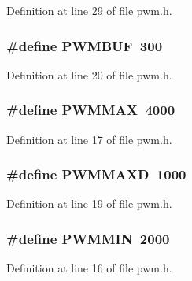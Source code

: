 Definition at line 29 of file pwm.\+h.

\subsubsection[{\texorpdfstring{P\+W\+M\+B\+UF}{PWMBUF}}]{\setlength{\rightskip}{0pt plus 5cm}\#define P\+W\+M\+B\+UF~300}\hypertarget{group___p_w_m_ga314546c7b69b0cbb81eb8e251790163a}{}\label{group___p_w_m_ga314546c7b69b0cbb81eb8e251790163a}


Definition at line 20 of file pwm.\+h.

\subsubsection[{\texorpdfstring{P\+W\+M\+M\+AX}{PWMMAX}}]{\setlength{\rightskip}{0pt plus 5cm}\#define P\+W\+M\+M\+AX~4000}\hypertarget{group___p_w_m_ga29eaa7ea340aed6c94c8208f548c4ac8}{}\label{group___p_w_m_ga29eaa7ea340aed6c94c8208f548c4ac8}


Definition at line 17 of file pwm.\+h.

\subsubsection[{\texorpdfstring{P\+W\+M\+M\+A\+XD}{PWMMAXD}}]{\setlength{\rightskip}{0pt plus 5cm}\#define P\+W\+M\+M\+A\+XD~1000}\hypertarget{group___p_w_m_ga4fda1cf5b4a72bd805a203b9665a155b}{}\label{group___p_w_m_ga4fda1cf5b4a72bd805a203b9665a155b}


Definition at line 19 of file pwm.\+h.

\subsubsection[{\texorpdfstring{P\+W\+M\+M\+IN}{PWMMIN}}]{\setlength{\rightskip}{0pt plus 5cm}\#define P\+W\+M\+M\+IN~2000}\hypertarget{group___p_w_m_ga6f330c196a65bb05fd5b7fff59d6f62f}{}\label{group___p_w_m_ga6f330c196a65bb05fd5b7fff59d6f62f}


Definition at line 16 of file pwm.\+h.

